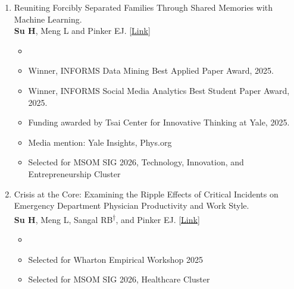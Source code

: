 \documentclass[letterpaper,11pt]{article}
\newif\ifpublic
\newcommand{\PrivatePaperStatusCi}{Resubmitted to \textit{Manufacturing \& Service Operations Management}}
\newcommand{\PrivatePaperStatusFamilyReunion}{Working Paper}
\newcommand{\PublicPaperStatusCi}{Major Revision at \textit{Manufacturing \& Service Operations Management}}
\newcommand{\PublicPaperStatusFamilyReunion}{Working Paper}
\newcommand{\PaperStatusCi}{\ifpublic\PublicPaperStatusCi\else\PrivatePaperStatusCi\fi}
\newcommand{\PaperStatusFamilyReunion}{\ifpublic\PublicPaperStatusFamilyReunion\else\PrivatePaperStatusFamilyReunion\fi}
\begin{document}
\begin{enumerate}[leftmargin=*]

    \item Reuniting Forcibly Separated Families Through Shared Memories with Machine Learning.\\ \textbf{Su H}, Meng L and Pinker EJ. \href{https://drive.google.com/file/d/1gnc4BEnxOJDHMa8qjcIGCTcUtESp9k-t/view?usp=sharing}{\textcolor{linkblue}{[Link]}}
    \vspace{-8pt}
    \begin{itemize}
        \item \PaperStatusFamilyReunion
        \vspace{-4pt}
        \item Winner, INFORMS Data Mining Best Applied Paper Award, 2025.
        \vspace{-4pt}
        \item Winner, INFORMS Social Media Analytics Best Student Paper Award, 2025.
        \vspace{-4pt}
        \item Funding awarded by Tsai Center for Innovative Thinking at Yale, 2025.
        \vspace{-4pt}
        \item Media mention: Yale Insights, Phys.org
        \vspace{-4pt}
        \item Selected for MSOM SIG 2026, Technology, Innovation, and Entrepreneurship Cluster
    \end{itemize}

    \vspace{-8pt}
    \item Crisis at the Core: Examining the Ripple Effects of Critical Incidents on Emergency Department Physician Productivity and Work Style. \\\textbf{Su H}, Meng L, Sangal RB\textsuperscript{†}, and Pinker EJ. \href{https://papers.ssrn.com/sol3/papers.cfm?abstract_id=5113467}{\textcolor{linkblue}{[Link]}}
    \vspace{-8pt}
    \begin{itemize}
        \item \PaperStatusCi
        \vspace{-4pt}
        \item Selected for Wharton Empirical Workshop 2025
        \vspace{-4pt}
        \item Selected for MSOM SIG 2026, Healthcare Cluster
    \end{itemize}


\end{enumerate}
\end{document}

